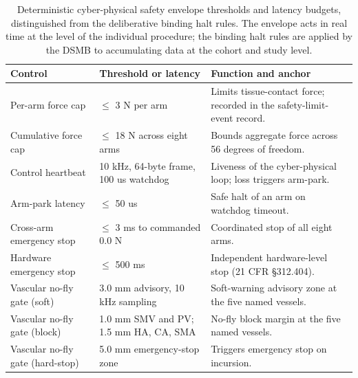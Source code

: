 \begin{table}[htbp]
\centering
\footnotesize
\caption{Deterministic cyber-physical safety envelope thresholds and latency
budgets, distinguished from the deliberative binding halt rules. The envelope acts
in real time at the level of the individual procedure; the binding halt rules are
applied by the DSMB to accumulating data at the cohort and study level.}
\label{tab:halt-envelope}
\begin{tabularx}{\textwidth}{L{4.6cm} L{4.2cm} Y}
\toprule
\textbf{Control} & \textbf{Threshold or latency} & \textbf{Function and anchor} \\
\midrule
Per-arm force cap & $\leq$ 3 N per arm & Limits tissue-contact force; recorded in the safety-limit-event record. \\
Cumulative force cap & $\leq$ 18 N across eight arms & Bounds aggregate force across 56 degrees of freedom. \\
Control heartbeat & 10 kHz, 64-byte frame, 100 us watchdog & Liveness of the cyber-physical loop; loss triggers arm-park. \\
Arm-park latency & $\leq$ 50 us & Safe halt of an arm on watchdog timeout. \\
Cross-arm emergency stop & $\leq$ 3 ms to commanded 0.0 N & Coordinated stop of all eight arms. \\
Hardware emergency stop & $\leq$ 500 ms & Independent hardware-level stop (21 CFR \S 312.404). \\
Vascular no-fly gate (soft) & 3.0 mm advisory, 10 kHz sampling & Soft-warning advisory zone at the five named vessels. \\
Vascular no-fly gate (block) & 1.0 mm SMV and PV; 1.5 mm HA, CA, SMA & No-fly block margin at the five named vessels. \\
Vascular no-fly gate (hard-stop) & 5.0 mm emergency-stop zone & Triggers emergency stop on incursion. \\
\bottomrule
\end{tabularx}
\end{table}
\vspace*{-0.6cm}

\clearpage

